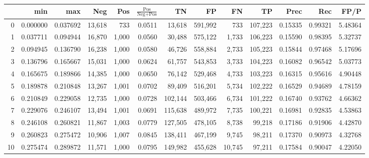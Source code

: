 \begin{tabular}{rrrrrrrrrrrrr}
\toprule
{} &       min &       max &     Neg &    Pos & $\frac{\text{Pos}}{\text{Neg}+\text{Pos}}$ &       TN &       FP &       FN &       TP &     Prec &      Rec &     FP/P \\
\midrule
0   &  0.000000 &  0.037692 &  13,618 &    733 &                                     0.0511 &   13,618 &  591,992 &      733 &  107,223 &  0.15335 &  0.99321 &  5.48364 \\
1   &  0.037711 &  0.094944 &  16,870 &  1,000 &                                     0.0560 &   30,488 &  575,122 &    1,733 &  106,223 &  0.15590 &  0.98395 &  5.32737 \\
2   &  0.094945 &  0.136790 &  16,238 &  1,000 &                                     0.0580 &   46,726 &  558,884 &    2,733 &  105,223 &  0.15844 &  0.97468 &  5.17696 \\
3   &  0.136796 &  0.165667 &  15,031 &  1,000 &                                     0.0624 &   61,757 &  543,853 &    3,733 &  104,223 &  0.16082 &  0.96542 &  5.03773 \\
4   &  0.165675 &  0.189866 &  14,385 &  1,000 &                                     0.0650 &   76,142 &  529,468 &    4,733 &  103,223 &  0.16315 &  0.95616 &  4.90448 \\
5   &  0.189878 &  0.210848 &  13,267 &  1,001 &                                     0.0702 &   89,409 &  516,201 &    5,734 &  102,222 &  0.16529 &  0.94689 &  4.78159 \\
6   &  0.210849 &  0.229058 &  12,735 &  1,000 &                                     0.0728 &  102,144 &  503,466 &    6,734 &  101,222 &  0.16740 &  0.93762 &  4.66362 \\
7   &  0.229076 &  0.246107 &  13,494 &  1,001 &                                     0.0691 &  115,638 &  489,972 &    7,735 &  100,221 &  0.16981 &  0.92835 &  4.53863 \\
8   &  0.246108 &  0.260821 &  11,867 &  1,003 &                                     0.0779 &  127,505 &  478,105 &    8,738 &   99,218 &  0.17186 &  0.91906 &  4.42870 \\
9   &  0.260823 &  0.275472 &  10,906 &  1,007 &                                     0.0845 &  138,411 &  467,199 &    9,745 &   98,211 &  0.17370 &  0.90973 &  4.32768 \\
10  &  0.275474 &  0.289872 &  11,571 &  1,000 &                                     0.0795 &  149,982 &  455,628 &   10,745 &   97,211 &  0.17584 &  0.90047 &  4.22050 \\

\end{tabular}
